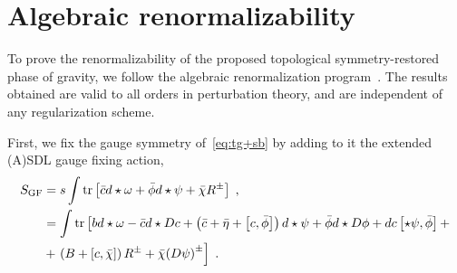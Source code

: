 \documentclass[../main.tex]{subfiles}
\begin{document}
\section{Algebraic renormalizability}%
\label{sec:quantum}

To prove the renormalizability of the proposed topological symmetry-restored phase of gravity, we follow the algebraic renormalization program~\cite{piguet1995b}. The results obtained are valid to all orders in perturbation theory, and are independent of any regularization scheme.

First, we fix the gauge symmetry of~\eqref{eq:tg+sb} by adding to it the extended (A){}SDL gauge fixing action,
\begin{subequations}%
  \label{eq:tg-gf-action}
  \begin{align}
    S_{\text{GF}} & = s \int \operatorname{tr} \left[ \bar{c} d \star \omega + \bar{\phi} d \star \psi + \bar{\chi} R^{\pm} \right] \;,                                                                                                                                \\
                  & = \int \operatorname{tr} \left[ b d \star \omega - \bar{c} d \star Dc + \left( \bar{c} + \bar{\eta} + \left[ c,\bar{\phi} \right] \right) d \star \psi + \bar{\phi} d \star D \phi + d c \left[ \star \psi ,\bar{\phi} \right] + \right. \nonumber \\
                  & + \left. \left( B + \left[ c,\bar{\chi} \right] \right) R^{\pm} + \bar{\chi} {\left( D \psi \right)}^{\pm} \right] \;.
  \end{align}
\end{subequations}
\end{document}
